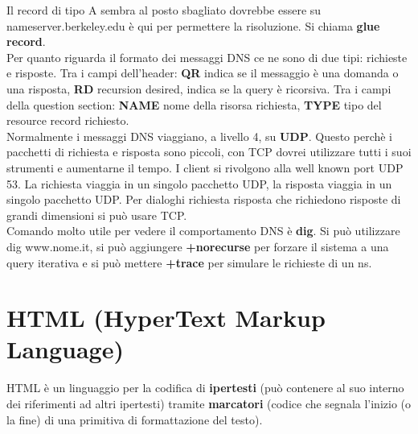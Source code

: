 \documentclass{article}
\begin{document}
\noindent
Il record di tipo A sembra al posto sbagliato dovrebbe essere su nameserver.berkeley.edu è qui per permettere la risoluzione. Si chiama \textbf{glue record}. \\
Per quanto riguarda il formato dei messaggi DNS ce ne sono di due tipi: richieste e risposte. Tra i campi dell'header: \textbf{QR} indica se il messaggio è una domanda o una risposta, \textbf{RD} recursion desired, indica se la query è ricorsiva. Tra i campi della question section: \textbf{NAME} nome della risorsa richiesta, \textbf{TYPE} tipo del resource record richiesto.\\
Normalmente i messaggi DNS viaggiano, a livello 4, su \textbf{UDP}. Questo perchè i pacchetti di richiesta e risposta sono piccoli, con TCP dovrei utilizzare tutti i suoi strumenti e aumentarne il tempo. I client si rivolgono alla well known port UDP 53. La richiesta viaggia in un singolo pacchetto UDP, la risposta viaggia in un singolo pacchetto UDP. Per dialoghi richiesta risposta che richiedono risposte di grandi dimensioni si può usare TCP. \\
Comando molto utile per vedere il comportamento DNS è \textbf{dig}. Si può utilizzare dig www.nome.it, si può aggiungere \textbf{+norecurse} per forzare il sistema a una query iterativa e si può mettere \textbf{+trace} per simulare le richieste di un ns.

\section{HTML (HyperText Markup Language)}
HTML è un linguaggio per la codifica di \textbf{ipertesti} (può contenere al suo interno dei riferimenti ad altri ipertesti) tramite \textbf{marcatori} (codice che segnala l'inizio (o la fine) di una primitiva di formattazione del testo).
\end{document}
